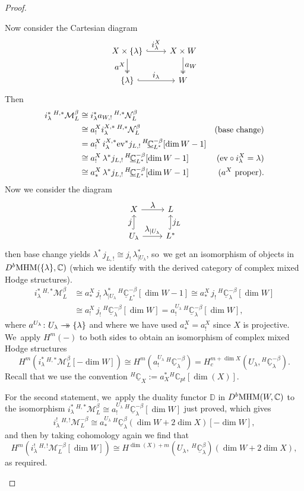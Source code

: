 \documentclass[JEP,XML,SOM,Unicode,published]{cedram}
\let\mathds\mathbb
\let\ts\textstyle
\newcommand{\onto}{\mathchoice{\to\hspace*{-5mm}\to}{\to\hspace*{-2.85mm}\to}{\to\hspace*{-3mm}\to}{\to\hspace*{-3mm}\to}}
\newcommand{\ev}{\mathrm{ev}}
\newcommand{\dC}{{\mathds C}}\let\C\dC
\newcommand{\bD}{{\mathbb D}}\let\mbd\bD
\newcommand{\cM}{\mathcal{M}}
\newcommand{\cN}{\mathcal{N}}
\newcommand{\MHM}{\textup{MHM}}
\newcommand{\Mh}{{^{H,*}}\cM_L^\beta}
\newcommand{\MhD}{{^{H,!}}\cM_L^{-\beta}}
\newcommand{\Nh}{{^{H,*}}\cN_L^\beta}
\begin{document}
\begin{proof}
\begin{enumerate}
Now consider the Cartesian diagram
\[
\begin{tikzcd}
X\times\{\lambda\} \ar[hook]{r}{\ts i_\lambda^X} \ar[twoheadrightarrow,swap]{d}{\ts a^X} & X\times W \ar[twoheadrightarrow]{d}{\ts a_W}\\
\{\lambda\} \ar[hook]{r}{\ts i_\lambda }& W
\end{tikzcd}
\]
Then
\begin{align*}
i_\lambda^*\, \Mh &\cong i_\lambda^* {a_{W,!}}\, \Nh \\
&\cong a^X_! i^{X,*}_\lambda \, \Nh
& (\textup{base change}) \\
&=
a^X_!\,i^{X,*}_\lambda \ev^* j_{L,!}\, ^{H\!}\underline{\dC}^{-\beta}_{L^{*}}[\dim W-1] \\
&\cong a_!^X\, \lambda^* j_{L,!}\, ^{H\!}\underline{\dC}^{-\beta}_{L^{*}}[\dim W-1] & (\ev \circ i^X_\lambda =\lambda) \\
&\cong a_*^X\, \lambda^* j_{L,!}\, ^{H\!}\underline{\dC}^{-\beta}_{L^{*}}[\dim W-1] & (a^X \textup{ proper}).
\end{align*}
Now we consider the diagram
\[
\begin{tikzcd}
X \ar{r}{\ts \lambda} & L \\
U_\lambda \ar[hook]{u}{\ts j}
\ar{r}{\ts \lambda_{|U_\lambda}}& L^{*}
\ar[hook,swap]{u}{\ts j_{L}}
\end{tikzcd}
\]
then base change yields $\lambda^*\, j_{L,!} \cong j_!\, \lambda_{|U_\lambda}^*$, so~we get an isomorphism of objects in $D^b\MHM(\{\lambda\},\dC)$ (which we identify with the derived category of complex mixed Hodge structures).
\begin{align*}
i_\lambda^*\, \Mh &\cong
a_*^X\, j_!\, \lambda_{|U_\lambda}^*\, ^{H\!}\underline{\dC}^{-\beta}_{L^{*}}[\dim W-1]
\cong
a_*^X\, j_!\, ^{H\!}\underline{\dC}^{-\beta}_\lambda[\dim W]\\
&\cong
a_!^X\, j_!\, ^{H\!}\underline{\dC}^{-\beta}_\lambda[\dim W]
=a^{U_\lambda}_!\, ^{H\!}\underline{\dC}^{-\beta}_\lambda[\dim W],
\end{align*}
where $a^{U_\lambda}\colon U_\lambda\onto \{\lambda\}$ and where we have used $a^X_*=a^X_!$
since $X$ is projective. We~apply $H^m(-)$ to both sides to obtain
an isomorphism of complex mixed Hodge structures
\[
H^m(i_\lambda^* \, \Mh [- \dim W]) \cong
H^m(a^{U_\lambda}_!\, ^{H\!}\underline{\dC}^{-\beta}_\lambda)
=H^{m+ \dim X}_c(U_\lambda, {^{H\!}}\underline{\dC}^{-\beta}_\lambda).
\]
Recall that we use the convention $^{H\!}\underline{\dC}_{X} := a_X^* {^H\!}\dC_{pt}[\dim(X)]$.

For the second statement, we~apply the duality functor $\bD$ in $D^b\MHM(W,\dC)$ to the isomorphism
$i_\lambda^*\, \Mh \cong a^{U_\lambda}_!\, ^{H\!}\underline{\dC}^{-\beta}_\lambda[\dim W]$ just proved, which gives
\[
i_\lambda^!\, \MhD \cong a^{U_\lambda}_*\, ^{H\!}\underline{\dC}^{\beta}_\lambda(\dim W + 2 \dim X)[-\dim W],
\]
and then by taking cohomology again we find that
\[
H^m(i_\lambda^! \, \MhD[\dim W]) \cong H^{\dim(X)+m}(U_\lambda,\,^{H\!}\underline{\dC}^{\beta}_\lambda)(\dim W + 2 \dim X),
\]
as required. \qedhere
\end{enumerate}
\end{proof}
\end{document}
